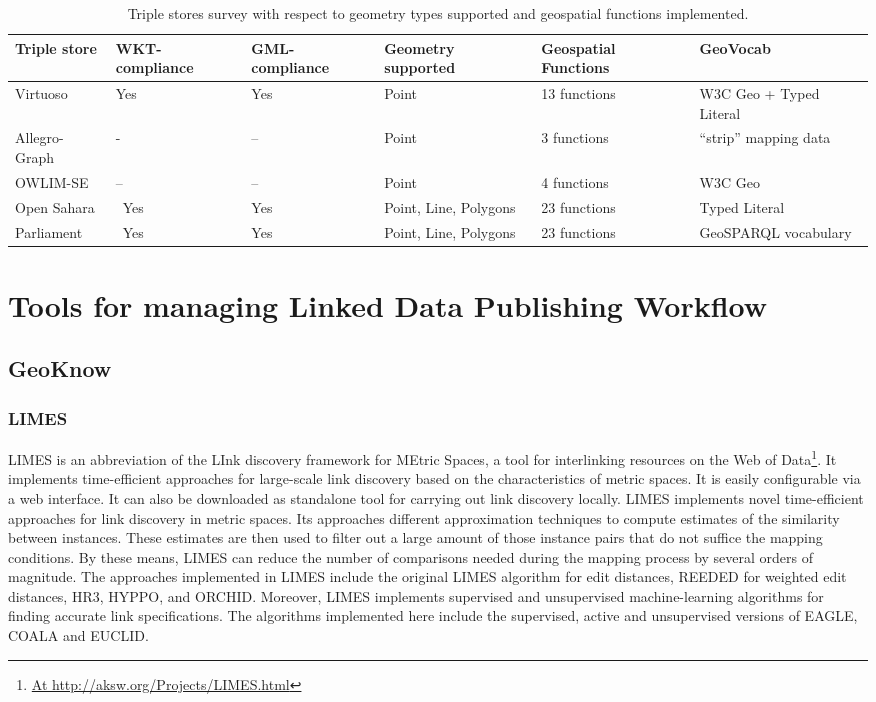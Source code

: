 \begin{table}[!htbp]
 \begin{tabularx}{\textwidth}{|X|X|X|X|X|l|}
 \hline
 \textbf{Triple store} & WKT-compliance & GML-compliance & Geometry supported  & Geospatial Functions & GeoVocab \\ \hline
 Virtuoso & Yes & Yes & Point & 13 functions & W3C Geo + Typed Literal  \\ \hline
 Allegro-Graph & \-- & -- & Point & 3 functions & ``strip'' mapping data \\ \hline
 OWLIM-SE & -- & -- & Point & 4 functions & W3C Geo\\ \hline
 Open Sahara & \ Yes & Yes & Point, Line, Polygons & 23 functions  & Typed Literal \\ \hline
 Parliament & \ Yes & Yes & Point, Line, Polygons & 23 functions  &  GeoSPARQL vocabulary\\ \hline
 \end{tabularx}
\caption{Triple stores survey with respect to geometry types supported and geospatial functions implemented.}
\label{tab:triplestore}
\end{table}


\section{Tools for managing Linked Data Publishing Workflow}
\label{sec:toolLD}

\subsection{GeoKnow}
\label{sec:geoknow}

\subsubsection{LIMES}
LIMES is an abbreviation of the LInk discovery framework for MEtric Spaces, a tool for interlinking resources on the Web of Data\footnote{\url{At http://aksw.org/Projects/LIMES.html}}. It implements time-efficient approaches for large-scale link discovery based on the characteristics of metric spaces. It is easily configurable via a web interface. It can also be downloaded as standalone tool for carrying out link discovery locally.
LIMES implements novel time-efficient approaches for link discovery in metric spaces. Its approaches different approximation techniques to compute estimates of the similarity between instances. These estimates are then used to filter out a large amount of those instance pairs that do not suffice the mapping conditions. By these means, LIMES can reduce the number of comparisons needed during the mapping process by several orders of magnitude. The approaches implemented in LIMES include the original LIMES algorithm for edit distances, REEDED for weighted edit distances, HR3, HYPPO, and ORCHID. Moreover, LIMES implements supervised and unsupervised machine-learning algorithms for finding accurate link specifications. The algorithms implemented here include the supervised, active and unsupervised versions of EAGLE, COALA and EUCLID.

